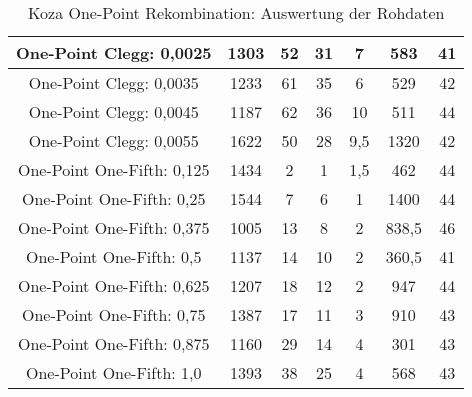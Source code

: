 \begin{table}[H]
\begin{tabular}{c | c | c | c | c | c | c}
		\hline
		One-Point Clegg: 0,0025 & 1303 & 52 & 31 & 7 & 583 & 41\\
		\hline
		One-Point Clegg: 0,0035 & 1233 & 61 & 35 & 6 & 529 & 42\\
		\hline
		One-Point Clegg: 0,0045 & 1187 & 62 & 36 & 10 & 511 & 44\\
		\hline
		One-Point Clegg: 0,0055 & 1622 & 50 & 28 & 9,5 & 1320 & 42\\
		\hline
		\hline
		One-Point One-Fifth: 0,125 & 1434 & 2 & 1 & 1,5 & 462 & 44\\
		\hline
		One-Point One-Fifth: 0,25 & 1544 & 7 & 6 & 1 & 1400 & 44\\
		\hline
		One-Point One-Fifth: 0,375 & 1005 & 13 & 8 & 2 & 838,5 & 46\\
		\hline
		One-Point One-Fifth: 0,5 & 1137 & 14 & 10 & 2 & 360,5 & 41\\
		\hline
		One-Point One-Fifth: 0,625 & 1207 & 18 & 12 & 2 & 947 & 44\\
		\hline
		One-Point One-Fifth: 0,75 & 1387 & 17 & 11 & 3 & 910 & 43\\
		\hline
		One-Point One-Fifth: 0,875 & 1160 & 29 & 14 & 4 & 301 & 43\\
		\hline
		One-Point One-Fifth: 1,0 & 1393 & 38 & 25 & 4 & 568 & 43\\
	\end{tabular}
	\caption{Koza One-Point Rekombination: Auswertung der Rohdaten}
	\label{table:kozaOnePointRohdaten}
\end{table}
